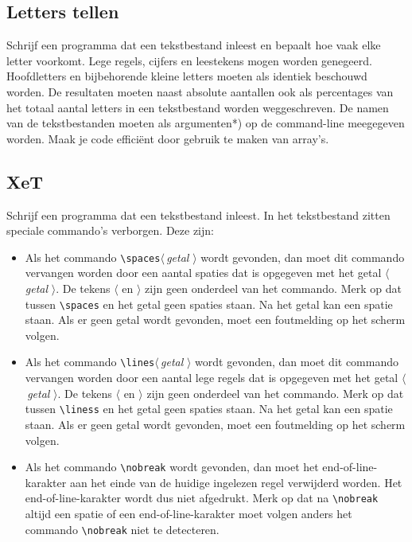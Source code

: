 \documentclass[a4paper,10pt,fleqn,twoside]{article}
\begin{document}
\subsection{Letters tellen}
Schrijf een programma dat een tekstbestand inleest en bepaalt hoe vaak elke letter voorkomt. Lege regels, cijfers en leestekens mogen worden genegeerd. Hoofdletters en bijbehorende kleine letters moeten als identiek beschouwd worden. De resultaten moeten naast absolute aantallen ook als percentages van het totaal aantal letters in een tekstbestand worden weggeschreven. De namen van de tekstbestanden moeten als argumenten*) op de command-line meegegeven worden. Maak je code efficiënt door gebruik te maken van array's.

\subsection{XeT}
Schrijf een programma dat een tekstbestand inleest. In het tekstbestand zitten speciale commando's verborgen. Deze zijn:

\begin{itemize}
\item Als het commando \lstinline|\spaces|$\langle$\,\textsl{getal} $\rangle$ wordt gevonden, dan moet dit commando vervangen worden door een aantal spaties dat is opgegeven met het getal $\langle$\,\textsl{getal} $\rangle$. De tekens $\langle$ en $\rangle$ zijn geen onderdeel van het commando. Merk op dat tussen \lstinline|\spaces| en het getal geen spaties staan. Na het getal kan een spatie staan. Als er geen getal wordt gevonden, moet een foutmelding op het scherm volgen.
\item Als het commando \lstinline|\lines|$\langle$\,\textsl{getal} $\rangle$ wordt gevonden, dan moet dit commando vervangen worden door een aantal lege regels dat is opgegeven met het getal $\langle$\,\textsl{getal} $\rangle$. De tekens $\langle$ en $\rangle$ zijn geen onderdeel van het commando. Merk op dat tussen \lstinline|\liness| en het getal geen spaties staan. Na het getal kan een spatie staan.  Als er geen getal wordt gevonden, moet een foutmelding op het scherm volgen.
\item Als het commando \lstinline|\nobreak| wordt gevonden, dan moet het end-of-line-karakter aan het einde van de huidige ingelezen regel verwijderd worden. Het end-of-line-karakter wordt dus niet afgedrukt. Merk op dat na \lstinline|\nobreak| altijd een spatie of een end-of-line-karakter moet volgen anders het commando \lstinline|\nobreak| niet te detecteren.
\end{itemize}
\end{document}
